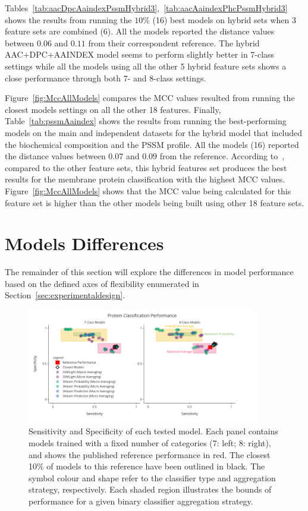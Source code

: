 Tables~\ref{tab:aacDpcAaindexPssmHybrid3},~\ref{tab:aacAaindexPhcPssmHybrid3} shows the results from running 
the $10\%$ (16) best models on hybrid sets when 3 feature sets are combined (6). All the models reported 
the distance values between $0.06$ and $0.11$ from their correspondent reference. The hybrid AAC+DPC+AAINDEX 
model seems to perform slightly better in 7-class settings while all the models using all the other 5 hybrid 
feature sets shows a close performance through both 7- and 8-class settings.

Figure~\ref{fig:MccAllModels} compares the MCC values resulted 
from running the closest models settings on all the other 18 features. Finally, Table~\ref{tab:pssmAaindex} 
shows the results from running the best-performing models on the main and independent datasets for the 
hybrid model that included the biochemical composition and the PSSM profile. All the models (16) reported 
the distance values between $0.07$ and $0.09$ from the reference. According to~\cite{mishra_prediction_2014},
compared to the other feature sets, this hybrid features set produces the best results for the 
membrane protein classification with the highest MCC values. 
Figure~\ref{fig:MccAllModels} shows that the MCC value being calculated for this 
feature set is higher than the other models being built using other 18 feature sets.

\section{Models Differences}
The remainder of this section will explore the differences in model performance based on the defined axes of
flexibility enumerated in Section~\ref{sec:experimentaldesign}.

\begin{figure}[ht]
    \centering
    \includegraphics[width=0.90\textwidth]{figures/14ModelPerformance.png}
    \caption{Sensitivity and Specificity of each tested model. Each panel contains models 
    trained with a fixed number of categories (7: left; 8: right), and shows the published 
    reference performance in red. The closest 10\% of models to this reference have been 
    outlined in black. The symbol colour and shape refer to the classifier type and aggregation 
    strategy, respectively. Each shaded region illustrates the bounds of performance for a given 
    binary classifier aggregation strategy.}
    \label{fig:modelPerformance}
\end{figure}

